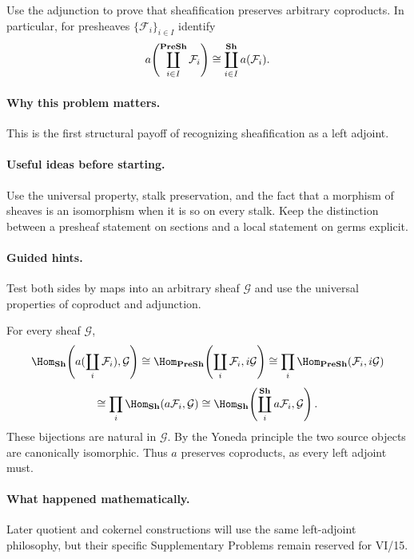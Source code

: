 \begin{problem}
Use the adjunction to prove that sheafification preserves arbitrary coproducts. In particular, for presheaves $\{\mathcal F_i\}_{i\in I}$ identify
\[
a\!\left(\coprod_{i\in I}^{\mathbf{PreSh}}\mathcal F_i\right)
\cong
\coprod_{i\in I}^{\mathbf{Sh}}a(\mathcal F_i).
\]
\end{problem}

\paragraph{Why this problem matters.}
This is the first structural payoff of recognizing sheafification as a left adjoint.

\paragraph{Useful ideas before starting.}
Use the universal property, stalk preservation, and the fact that a morphism of sheaves is an isomorphism when it is so on every stalk.  Keep the distinction between a presheaf statement on sections and a local statement on germs explicit.

\paragraph{Guided hints.}
Test both sides by maps into an arbitrary sheaf $\mathcal G$ and use the universal properties of coproduct and adjunction.

\ifdefined\FullProblemDossiers
\begin{solution}
For every sheaf $\mathcal G$,
\[
\Hom_{\Sh}\!\left(a(\coprod_i\mathcal F_i),\mathcal G\right)
\cong
\Hom_{\PreSh}\!\left(\coprod_i\mathcal F_i,i\mathcal G\right)
\cong
\prod_i\Hom_{\PreSh}(\mathcal F_i,i\mathcal G)
\]
\[
\cong
\prod_i\Hom_{\Sh}(a\mathcal F_i,\mathcal G)
\cong
\Hom_{\Sh}\!\left(\coprod_i^{\Sh}a\mathcal F_i,\mathcal G\right).
\]
These bijections are natural in $\mathcal G$. By the Yoneda principle the two source objects are canonically isomorphic. Thus $a$ preserves coproducts, as every left adjoint must.
\end{solution}

\paragraph{What happened mathematically.}
Later quotient and cokernel constructions will use the same left-adjoint philosophy, but their specific Supplementary Problems remain reserved for VI/15.

